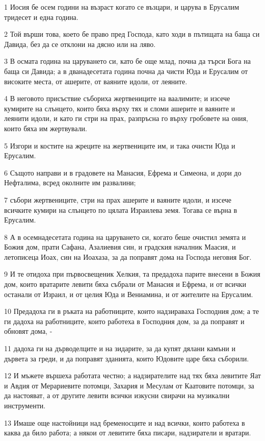 \par 1 Иосия бе осем години на възраст когато се възцари, и царува в Ерусалим тридесет и една година.
\par 2 Той върши това, което бе право пред Господа, като ходи в пътищата на баща си Давида, без да се отклони на дясно или на ляво.
\par 3 В осмата година на царуването си, като бе още млад, почна да търси Бога на баща си Давида; а в дванадесетата година почна да чисти Юда и Ерусалим от високите места, от ашерите, от ваяните идоли, от леяните.
\par 4 В неговото присъствие събориха жертвениците на ваалимите; и изсече кумирите на слънцето, които бяха върху тях и сломи ашерите и ваяните и леянити идоли, и като ги стри на прах, разпръсна го върху гробовете на ония, които бяха им жертвували.
\par 5 Изгори и костите на жреците на жертвениците им, и така очисти Юда и Ерусалим.
\par 6 Същото направи и в градовете на Манасия, Ефрема и Симеона, и дори до Нефталима, всред околните им развалини;
\par 7 събори жертвениците, стри на прах ашерите и ваяните идоли, и изсече всичките кумири на слънцето по цялата Израилева земя. Тогава се върна в Ерусалим.
\par 8 А в осемнадесетата година на царуването си, когато беше очистил земята и Божия дом, прати Сафана, Азалиевия син, и градския началник Маасия, и летописеца Иоах, син на Иоахаза, за да поправят дома на Господа неговия Бог.
\par 9 И те отидоха при първосвещеник Хелкия, та предадоха парите внесени в Божия дом, които вратарите левити бяха събрали от Манасия и Ефрема, и от всички останали от Израил, и от целия Юда и Вениамина, и от жителите на Ерусалим.
\par 10 Предадоха ги в ръката на работниците, които надзираваха Господния дом; а те ги дадоха на работниците, които работеха в Господния дом, за да поправят и обновят дома, -
\par 11 дадоха ги на дърводелците и на зидарите, за да купят дялани камъни и дървета за греди, и да поправят зданията, които Юдовите царе бяха съборили.
\par 12 И мъжете вършеха работата честно; а надзирателите над тях бяха левитите Яат и Авдия от Мерариевите потомци, Захария и Месулам от Каатовите потомци, за да настояват, а от другите левити всички изкусни свирачи на музикални инструменти.
\par 13 Имаше още настойници над бременосците и над всички, които работеха в каква да било работа; а някои от левитите бяха писари, надзиратели и вратари.
